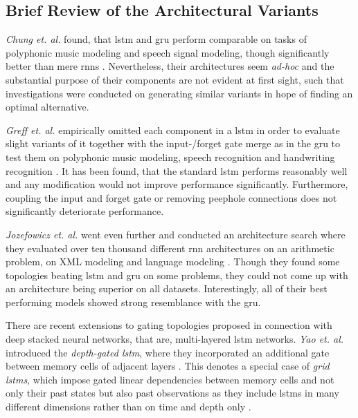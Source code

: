 \subsection{Brief Review of the Architectural Variants} 
\textit{Chung et. al.} found, that \gls{lstm} and \gls{gru} perform comparable on tasks of polyphonic music modeling and speech signal modeling, though significantly better than mere \glspl{rnn} \cite{ChuGu2014}.
Nevertheless, their architectures seem \textit{ad-hoc} and the substantial purpose of their components are not evident at first sight, such that investigations were conducted on generating similar variants in hope of finding an optimal alternative.

\textit{Greff et. al.} empirically omitted each component in a \gls{lstm} in order to evaluate slight variants of it together with the input-/forget gate merge as in the \gls{gru} to test them on polyphonic music modeling, speech recognition and handwriting recognition \cite{GreSri2015}.
It has been found, that the standard \gls{lstm} performs reasonably well and any modification would not improve performance significantly.
Furthermore, coupling the input and forget gate or removing peephole connections does not significantly deteriorate performance.

\textit{Jozefowicz et. al.} went even further and conducted an architecture search where they evaluated over ten thousand different \gls{rnn} architectures on an arithmetic problem, on XML modeling and language modeling \cite{JoZa2015}.
Though they found some topologies beating \gls{lstm} and \gls{gru} on some problems, they could not come up with an architecture being superior on all datasets.
Interestingly, all of their best performing models showed strong resemblance with the \gls{gru}. 

There are recent extensions to gating topologies proposed in connection with deep stacked neural networks, that are, multi-layered \gls{lstm} networks.
\textit{Yao et. al.} introduced the \textit{depth-gated \gls{lstm}}, where they incorporated an additional gate between memory cells of adjacent layers \cite{Yao2015}.
This denotes a special case of \textit{grid \glspl{lstm}}, which impose gated linear dependencies between memory cells and not only their past states but also past observations as they include \glspl{lstm} in many different dimensions rather than on time and depth only \cite{Kada2015}.

